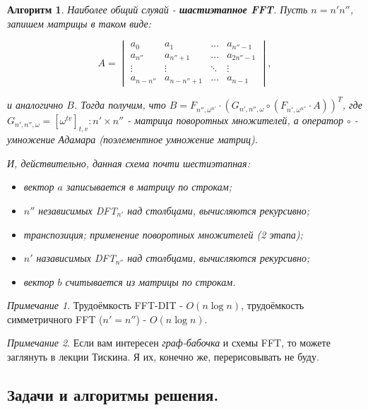 \documentclass[a4paper]{article}
\theoremstyle{indented}
\newtheorem{alg}{Алгоритм}
\theoremstyle{definition}
\theoremstyle{remark}
\newtheorem{remark}{Примечание}
\begin{document}
\begin{alg}
    Наиболее общий слуяай - \textbf{шастиэтапное FFT}. Пусть $n=n'n''$, запишем матрицы в таком виде:

    \begin{equation*}
        A=
        \begin{vmatrix}
            a_0 & a_1 & \dots & a_{n''-1} \\
            a_{n''} & a_{n''+1} & \dots & a_{2n''-1} \\
            \vdots & \vdots & \ddots & \vdots \\
            a_{n-n''} & a_{n-n''+1} & \dots & a_{n-1} 
        \end{vmatrix}, 
    \end{equation*}

    и аналогично $B$. Тогда получим, что $B=F_{n'', \omega^{n'}}\cdot (G_{n', n'', \omega}\circ (F_{n', \omega^{n''}}\cdot A))^T$, где $G_{n', n'', \omega}=[\omega^{tv}]_{t, v}: n'\times n''$ - матрица \textit{поворотных множителей}, а оператор $\circ$ - \textit{умножение Адамара} (поэлементное умножение матриц). \ 

    И, действительно, данная схема почти шестиэтапная:

    \begin{itemize}
        \item вектор $a$ записывается в матрицу по строкам; 
        \item $n''$ независимых DFT$_{n'}$ над столбцами, вычисляются рекурсивно; 
        \item транспозиция; применение поворотных множителей (2 этапа); 
        \item $n'$ назависимых DFT$_{n''}$ над столбцами, вычисляются рекурсивно; 
        \item вектор $b$ считывается из матрицы по строкам.
    \end{itemize}
\end{alg}

\begin{remark}
    Трудоёмкость FFT-DIT - $O(n \log n)$, трудоёмкость симметричного FFT ($n'=n''$) - $O(n \log n)$. 
\end{remark}

\begin{remark}
    Если вам интересен \textit{граф-бабочка} и схемы FFT, то можете заглянуть в лекции Тискина. Я их, конечно же, перерисовывать не буду.
\end{remark}

\subsection{Задачи и алгоритмы решения.}
\end{document}
